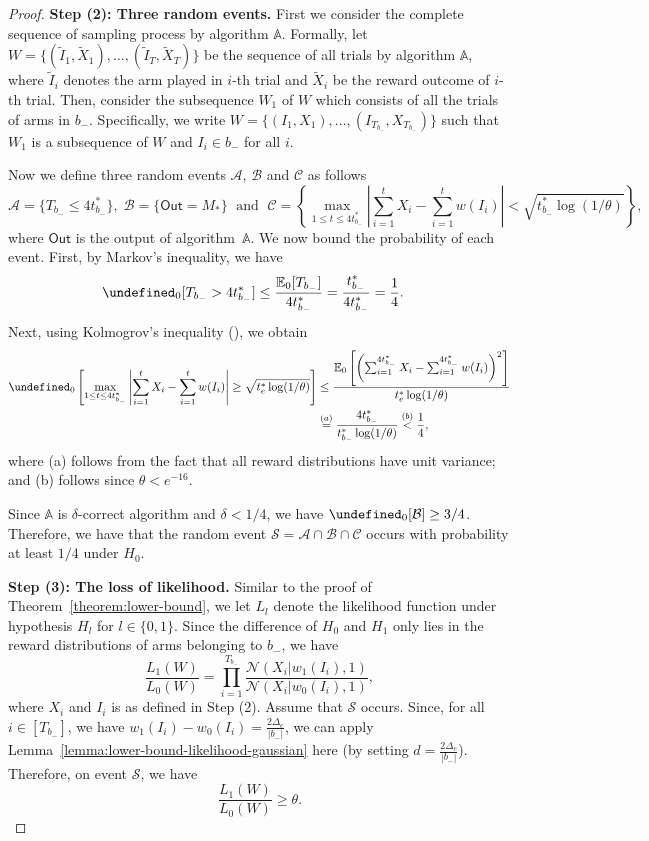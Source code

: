 \documentclass{article}
\newcommand{\E}{\mathbb E}
\newcommand{\out}{\mathsf{Out}}
\let\Pr\undefined
\DeclareMathOperator{\Pr}{Pr}
\begin{document}
\begin{proof}
\textbf{Step (2): Three random events.}
First we consider the complete sequence of sampling process by algorithm $\mathbb A$.
Formally, let $W=\{(\tilde I_1,\tilde X_1),\ldots, (\tilde I_T, \tilde X_T)\}$ be the sequence of all trials by algorithm $\mathbb A$, where $\tilde I_i$ denotes the arm played in $i$-th trial and $\tilde X_i$ be the reward outcome of $i$-th trial.
Then, consider the subsequence $W_1$ of $W$ which consists of all the trials of arms in $b_-$.
Specifically, we write $W=\{(I_1,X_1),\ldots,(I_{T_{b_-}}, X_{T_{b_-}})\}$ such that $W_1$ is a subsequence of $W$ and $I_i \in b_-$ for all $i$.

Now we  define three random events $\mathcal A$, $\mathcal B$ and $\mathcal C$ as follows
$$
\mathcal A = \{T_{b_-} \le 4t_{b_-}^* \},\;\mathcal B=\{\out=M_*\}\;\text{ and }\;
\mathcal C=\left\{\max_{1\le t \le 4t_{b_-}^*} \left|\sum_{i=1}^t X_i -\sum_{i=1}^t w(I_i)\right|  < \sqrt{t_{b_-}^*\log(1/\theta)} \right\},
$$
where $\out$ is the output of algorithm~$\mathbb A$. We now bound the probability of each event.
First, by Markov's inequality, we have
\begin{align*}
\Pr_0[T_{b_-} > 4t_{b_-}^*] &\le \frac{\E_0[T_{b_-}]}{4t_{b_-}^*} = \frac{t_{b_-}^*}{4t_{b_-}^*} = \frac14.
\end{align*}
Next, using Kolmogrov's inequality (), we obtain
\begin{align*}
\Pr_0\left[\max_{1\le t \le 4t_{b_-}^*} \left|\sum_{i=1}^t X_i - \sum_{i=1}^t w(I_i) \right| \ge \sqrt{t_e^*\log(1/\theta)} \right]
&\le \frac{\E_0\left[ \left(\sum_{i=1}^{4t_{b_-}^*} X_i - \sum_{i=1}^{4t_{b_-}^*} w(I_i)\right)^2\right]}{t_e^*\log(1/\theta)}\\
&\stackrel{\text(a)}{=} \frac{4t_{b_-}^*}{t_{b_-}^*\log(1/\theta)} \stackrel{\text(b)}{<} \frac14,
\end{align*}
where (a) follows from the fact that all reward distributions have unit variance; and (b) follows 
since $\theta < e^{-16}$.


Since $\mathbb A$ is $\delta$-correct algorithm and $\delta < 1/4$, we have $\Pr_0[\mathcal B]\ge 3/4$. Therefore, we have that the random event $\mathcal S=\mathcal A \cap \mathcal B \cap \mathcal C$ occurs with probability at least $1/4$ under $H_0$.


\textbf{Step (3): The loss of likelihood.} Similar to the proof of Theorem~\ref{theorem:lower-bound}, we let $L_l$ denote the likelihood function under hypothesis $H_l$ for $l\in\{0,1\}$. 
Since the difference of $H_0$ and $H_1$ only lies in the reward distributions of arms belonging to $b_-$, we have
$$
\frac{L_1(W)}{L_0(W)} = \prod_{i=1}^{T_{b_-}} \frac{\mathcal N(X_i | w_1(I_i), 1)}{\mathcal N(X_i | w_0(I_i), 1)},
$$
where $X_i$ and $I_i$ is as defined in Step (2).
Assume that $\mathcal S$ occurs.
Since, for all $i \in [T_{b_-}]$, we have $w_1(I_i)-w_0(I_i) = \frac{2\Delta_e}{|b_-|}$, we can apply Lemma~\ref{lemma:lower-bound-likelihood-gaussian} here (by setting $d=\frac{2\Delta_e}{|b_-|}$).
Therefore, on event $\mathcal S$, we have
$$
\frac{L_1(W)}{L_0(W)} \ge \theta.
$$


\end{proof}
\end{document}
